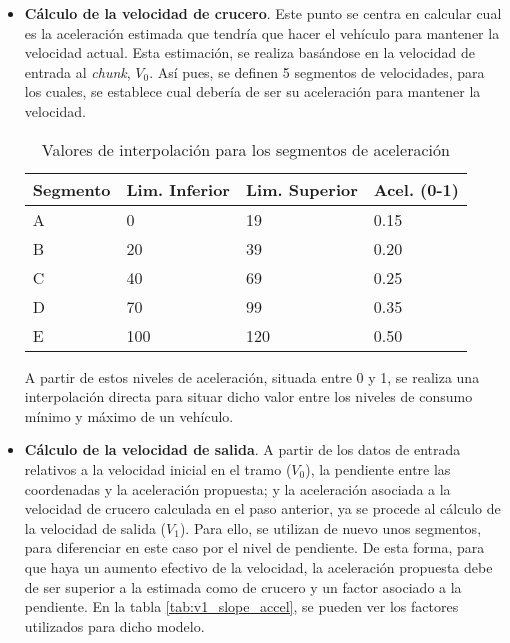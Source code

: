 \documentclass[11pt,spanish,listoffigures,listoftables]{tfgetsinf}
\begin{document}
\begin{itemize}
    \item \textbf{Cálculo de la velocidad de crucero}. Este punto se centra en calcular cual es la aceleración estimada que tendría que hacer el vehículo para mantener la velocidad actual. Esta estimación, se realiza basándose en la velocidad de entrada al \textit{chunk}, $V_{0}$. Así pues, se definen 5 segmentos de velocidades, para los cuales, se establece cual debería de ser su aceleración para mantener la velocidad.
    \begin{table}[h]
    \centering
    \begin{tabular}{|l|l|l|l|}
    \hline
    \textbf{Segmento} & \textbf{Lim. Inferior} & \textbf{Lim. Superior} & \textbf{Acel. (0-1)} \\ \hline
    A        & 0             & 19            & 0.15         \\ \hline
    B        & 20            & 39            & 0.20         \\ \hline
    C        & 40            & 69            & 0.25         \\ \hline
    D        & 70            & 99            & 0.35         \\ \hline
    E        & 100           & 120           & 0.50         \\ \hline
    \end{tabular}
    \caption{Valores de interpolación para los segmentos de aceleración}
    \label{tab:v1_accel_interp}
    \end{table}
    
    A partir de estos niveles de aceleración, situada entre 0 y 1, se realiza una interpolación directa para situar dicho valor entre los niveles de consumo mínimo y máximo de un vehículo.
    
    \item \textbf{Cálculo de la velocidad de salida}. A partir de los datos de entrada relativos a la velocidad inicial en el tramo ($V_{0}$), la pendiente entre las coordenadas y la aceleración propuesta; y la aceleración asociada a la velocidad de crucero calculada en el paso anterior, ya se procede al cálculo de la velocidad de salida ($V_{1}$). Para ello, se utilizan de nuevo unos segmentos, para diferenciar en este caso por el nivel de pendiente. De esta forma, para que haya un aumento efectivo de la velocidad, la aceleración propuesta debe de ser superior a la estimada como de crucero y un factor asociado a la pendiente. En la tabla \ref{tab:v1_slope_accel}, se pueden ver los factores utilizados para dicho modelo.
    

\end{itemize}
\end{document}
